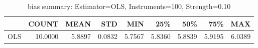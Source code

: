 \begin{table}[ht]
\centering
\caption{bias summary: Estimator=OLS, Instruments=100, Strength=0.10}
\begin{tabular}{lrrrrrrrr}
\toprule
 & COUNT & MEAN & STD & MIN & 25\% & 50\% & 75\% & MAX \\
\midrule
OLS & 10.0000 & 5.8897 & 0.0832 & 5.7567 & 5.8360 & 5.8839 & 5.9195 & 6.0389 \\
\bottomrule
\end{tabular}
\end{table}
